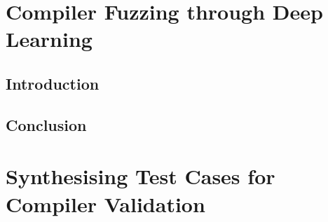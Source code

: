 \ifstapled
\chapter{Compiler Fuzzing through Deep Learning}
\section{Introduction}
\lipsum[1-2]

\section{Conclusion}
\lipsum[1-2]
\else
\chapter{Synthesising Test Cases for Compiler Validation}
\label{chap:deepsmith}






\fi
